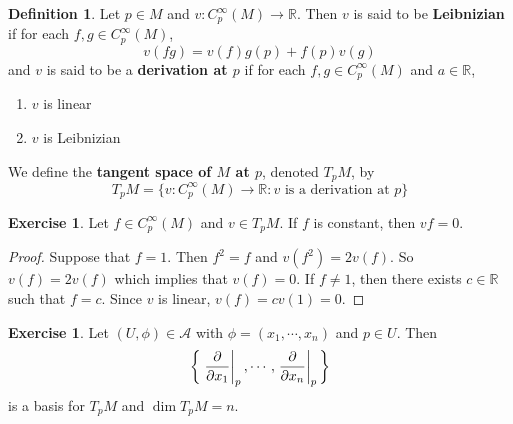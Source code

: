 \documentclass[12pt]{amsart}
\theoremstyle{definition}
\newtheorem{defn}[definition]{Definition}
\theoremstyle{remark}
\theoremstyle{definition}
\newtheorem{ex}[definition]{Exercise}
\newcommand{\R}{\mathbb{R}}
\newcommand{\MA}{\mathcal{A}}
\begin{document}
	\begin{defn}
		Let $p \in M$ and $v: C^{\infty}_p(M) \rightarrow \R$. Then $v$ is said to be \textbf{Leibnizian} if for each $f,g \in  C^{\infty}_p(M)$, $$v(fg) = v(f)g(p) + f(p)v(g)$$ and $v$ is said to be a \textbf{derivation at $p$} if for each $f, g \in C^{\infty}_p(M)$ and $a \in \R$,
		\begin{enumerate}
			\item $v$ is linear 
			\item $v$ is Leibnizian
		\end{enumerate}
		We define the \textbf{tangent space of $M$ at $p$}, denoted $T_pM$, by $$T_pM = \{ v: C^{\infty}_p(M) \rightarrow \R: v \text{ is a derivation at }p\}$$
	\end{defn}

	\begin{ex}
		Let $f \in C^{\infty}_p(M)$ and $v \in T_pM$. If $f$ is constant, then $vf = 0$.
	\end{ex}

	\begin{proof}
		Suppose that $f = 1$. Then $f^2 = f$ and $v(f^2) = 2v(f)$. So $v(f) = 2v(f)$ which implies that $v(f) = 0$. If $f \neq 1$, then there exists $c \in \R$ such that $f = c$. Since $v$ is linear, $v(f) = cv(1) = 0$.
	\end{proof}

	\begin{ex}
		Let $(U, \phi) \in \MA$ with $\phi = (x_1, \cdots, x_n)$ and $p \in U$. Then $$ \bigg \{\eval{\pdv{x_1}}_{p}, \cdots, \eval{\pdv{x_n}}_{p} \bigg \}$$ is a basis for $T_pM$ and $\dim T_pM = n$.
	\end{ex}
\end{document}
